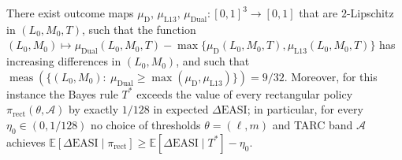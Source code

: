 ﻿\begin{theorem}\label{thm:bayes-rect-gap}
There exist outcome maps $\mu_{\mathrm D},\,\mu_{\mathrm{L13}},\,\mu_{\mathrm{Dual}}:[0,1]^3\to[0,1]$ that are $2$-Lipschitz in $(L_0,M_0,T)$, such that the function $(L_0,M_0)\mapsto \mu_{\mathrm{Dual}}(L_0,M_0,T)-\max\{\mu_{\mathrm D}(L_0,M_0,T),\mu_{\mathrm{L13}}(L_0,M_0,T)\}$ has increasing differences in $(L_0,M_0)$, and such that $\operatorname{meas}(\{(L_0,M_0):\ \mu_{\mathrm{Dual}}\ge \max(\mu_{\mathrm D},\mu_{\mathrm{L13}})\})=9/32$. Moreover, for this instance the Bayes rule $T^{*}$ exceeds the value of every rectangular policy $\pi_{\mathrm{rect}}(\theta,\mathcal A)$ by exactly $1/128$ in expected $\Delta\mathrm{EASI}$; in particular, for every $\eta_0\in(0,1/128)$ no choice of thresholds $\theta=(\ell,m)$ and TARC band $\mathcal A$ achieves $\mathbb{E}[\Delta\mathrm{EASI}\mid \pi_{\mathrm{rect}}]\ge \mathbb{E}[\Delta\mathrm{EASI}\mid T^{*}]-\eta_0$.
\end{theorem}

